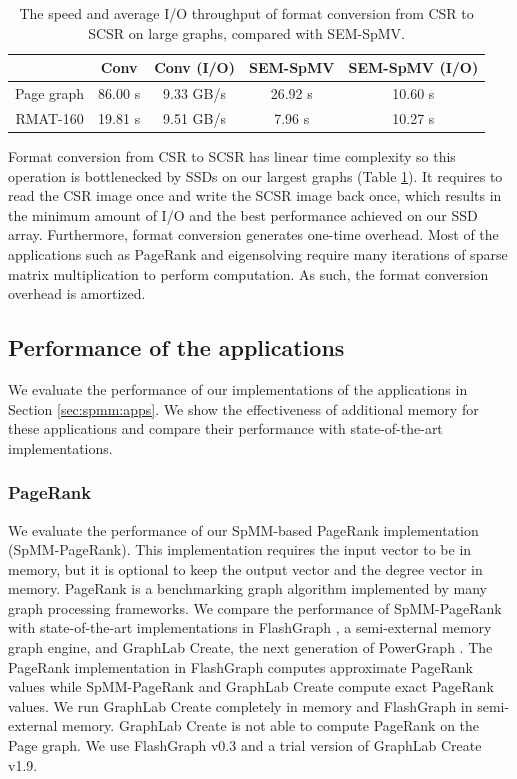 \begin{table}
\begin{center}
\footnotesize
\begin{tabular}{|c|c|c|c|c|}
\hline
	& Conv & Conv (I/O) & SEM-SpMV & SEM-SpMV (I/O) \\
\hline
Page graph & 86.00 s & 9.33 GB/s & 26.92 s & 10.60 s\\
\hline
RMAT-160 & 19.81 s & 9.51 GB/s & 7.96 s & 10.27 s\\
\hline
\end{tabular}
\normalsize
\end{center}
\caption{The speed and average I/O throughput of format conversion from CSR
	to SCSR on large graphs, compared with SEM-SpMV.}
\label{convert}
\end{table}

Format conversion from CSR to SCSR has linear time complexity so this operation
is bottlenecked by SSDs on our largest graphs (Table \ref{convert}).
It requires to read
the CSR image once and write the SCSR image back once, which results in
the minimum amount of I/O and the best performance achieved on our SSD array.
Furthermore, format conversion generates one-time overhead. Most of the applications
such as PageRank and eigensolving require many iterations of sparse matrix
multiplication to perform computation. As such, the format conversion overhead
is amortized.

\subsection{Performance of the applications}

We evaluate the performance of our implementations of the applications in
Section \ref{sec:spmm:apps}. We show the effectiveness of additional memory for
these applications and compare their performance with state-of-the-art
implementations.

\subsubsection{PageRank}
We evaluate the performance of our SpMM-based PageRank implementation
(SpMM-PageRank). This implementation requires the input vector to be in memory,
but it is optional to keep the output vector and the degree vector in memory.
PageRank is a benchmarking graph algorithm implemented by many graph processing
frameworks. We compare the performance of SpMM-PageRank with state-of-the-art
implementations in FlashGraph \cite{FlashGraph}, a semi-external memory graph
engine, and GraphLab Create, the next generation of PowerGraph \cite{powergraph}.
The PageRank implementation in FlashGraph computes
approximate PageRank values while SpMM-PageRank and GraphLab Create compute
exact PageRank values. We run GraphLab Create completely in memory and
FlashGraph in semi-external memory. GraphLab Create is not able to compute
PageRank on the Page graph. We use FlashGraph v0.3 and a trial version of
GraphLab Create v1.9.

